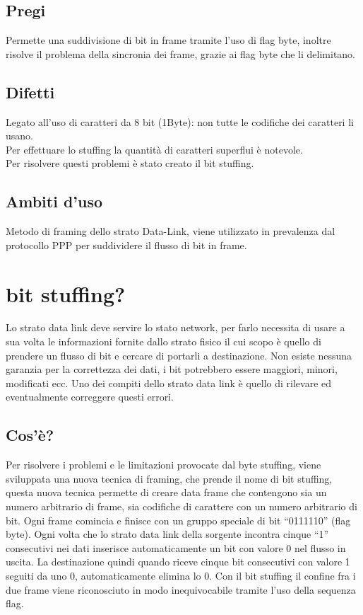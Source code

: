 \subsection{Pregi}
Permette una suddivisione di bit in frame tramite l'uso di flag byte, inoltre risolve il problema della sincronia dei frame, grazie ai flag byte che li delimitano.

\subsection{Difetti}
Legato all'uso di caratteri da 8 bit (1Byte): non tutte le codifiche dei caratteri li usano.\\
Per effettuare lo stuffing la quantità di caratteri superflui è notevole.\\
Per risolvere questi problemi è stato creato il bit stuffing.

\subsection{Ambiti d'uso}
Metodo di framing dello strato Data-Link, viene utilizzato in prevalenza dal protocollo PPP per suddividere il flusso di bit in frame.

\section{bit stuffing?}

Lo strato data link deve servire lo stato network, per farlo necessita di usare a sua volta le informazioni fornite dallo strato fisico il cui scopo è quello di prendere un flusso di bit e cercare di portarli a destinazione.
Non esiste nessuna garanzia per la correttezza dei dati, i bit potrebbero essere maggiori, minori, modificati ecc. Uno dei compiti dello strato data link è quello di rilevare ed eventualmente correggere questi errori.
\subsection{Cos'è?}
Per risolvere i problemi e le limitazioni provocate dal byte stuffing, viene sviluppata una nuova tecnica di framing, che prende il nome di bit stuffing, questa nuova tecnica permette di creare data frame che contengono sia un numero arbitrario di frame, sia codifiche di carattere con un numero arbitrario di bit.
Ogni frame comincia e finisce con un gruppo speciale di bit “0111110” (flag byte). Ogni volta che lo strato data link della sorgente incontra cinque “1” consecutivi nei dati inserisce automaticamente un bit con valore 0 nel flusso in uscita. La destinazione quindi quando riceve cinque bit consecutivi con valore 1 seguiti da uno 0, automaticamente elimina lo 0.
Con il bit stuffing il confine fra i due frame viene riconosciuto in modo inequivocabile tramite l'uso della sequenza flag.
 
